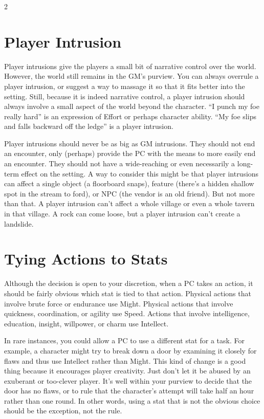 \begin{multicols}{2}
\chapter{Player Intrusion}

Player intrusions give the players a small bit of narrative control over the world. However, the world still remains in the GM’s purview. You can always overrule a player intrusion, or suggest a way to massage it so that it fits better into the setting. Still, because it is indeed narrative control, a player intrusion should always involve a small aspect of the world beyond the character. “I punch my foe really hard” is an expression of Effort or perhaps character ability. “My foe slips and falls backward off the ledge” is a player intrusion.

Player intrusions should never be as big as GM intrusions. They should not end an encounter, only (perhaps) provide the PC with the means to more easily end an encounter. They should not have a wide-reaching or even necessarily a long-term effect on the setting. A way to consider this might be that player intrusions can affect a single object (a floorboard snaps), feature (there’s a hidden shallow spot in the stream to ford), or NPC (the vendor is an old friend). But not more than that. A player intrusion can’t affect a whole village or even a whole tavern in that village. A rock can come loose, but a player intrusion can’t create a landslide.

\chapter{Tying Actions to Stats}

Although the decision is open to your discretion, when a PC takes an action, it should be fairly obvious which stat is tied to that action. Physical actions that involve brute force or endurance use Might. Physical actions that involve quickness, coordination, or agility use Speed. Actions that involve intelligence, education, insight, willpower, or charm use Intellect.

In rare instances, you could allow a PC to use a different stat for a task. For example, a character might try to break down a door by examining it closely for flaws and thus use Intellect rather than Might. This kind of change is a good thing because it encourages player creativity. Just don’t let it be abused by an exuberant or too-clever player. It’s well within your purview to decide that the door has no flaws, or to rule that the character’s attempt will take half an hour rather than one round. In other words, using a stat that is not the obvious choice should be the exception, not the rule.


\end{multicols}
